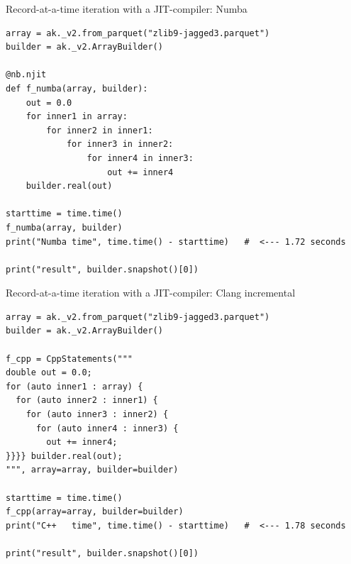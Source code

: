\documentclass[aspectratio=169]{beamer}
\begin{document}
\begin{frame}[fragile]{Record-at-a-time iteration with a JIT-compiler: Numba}
\vspace{0.1 cm}
\small
\begin{verbatim}
array = ak._v2.from_parquet("zlib9-jagged3.parquet")
builder = ak._v2.ArrayBuilder()

@nb.njit
def f_numba(array, builder):
    out = 0.0
    for inner1 in array:
        for inner2 in inner1:
            for inner3 in inner2:
                for inner4 in inner3:
                    out += inner4
    builder.real(out)

starttime = time.time()
f_numba(array, builder)
print("Numba time", time.time() - starttime)   #  <--- 1.72 seconds

print("result", builder.snapshot()[0])
\end{verbatim}
\end{frame}

\begin{frame}[fragile]{Record-at-a-time iteration with a JIT-compiler: Clang incremental}
\vspace{0.1 cm}
\small
\begin{verbatim}
array = ak._v2.from_parquet("zlib9-jagged3.parquet")
builder = ak._v2.ArrayBuilder()

f_cpp = CppStatements("""
double out = 0.0;
for (auto inner1 : array) {
  for (auto inner2 : inner1) {
    for (auto inner3 : inner2) {
      for (auto inner4 : inner3) {
        out += inner4;
}}}} builder.real(out);
""", array=array, builder=builder)

starttime = time.time()
f_cpp(array=array, builder=builder)
print("C++   time", time.time() - starttime)   #  <--- 1.78 seconds

print("result", builder.snapshot()[0])
\end{verbatim}
\end{frame}
\end{document}
